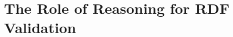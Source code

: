 \documentclass{llncs}
\newcommand{\tb}[1]{\todo[size=\small, color=green!40]{\textbf{Thomas:} #1}}
\newcommand{\er}[1]{\todo[size=\small, color=red!40]{\textbf{Erman:} #1}}
\begin{document}

\section{The Role of Reasoning for RDF Validation}
\label{the-role-of-reasoning-for-rdf-validation}
\end{document}
